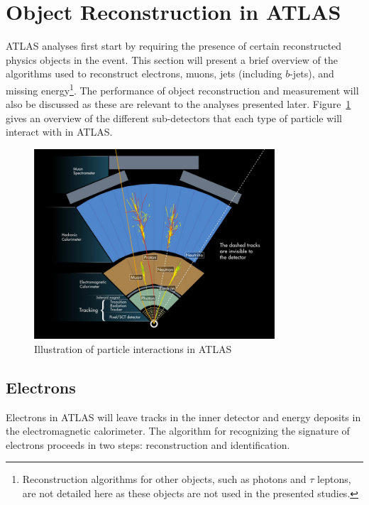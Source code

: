 \section{Object Reconstruction in ATLAS}

ATLAS analyses first start by requiring the presence of certain reconstructed physics objects in the event. This section will present a brief overview of the algorithms used to reconstruct electrons, muons, jets (including $b$-jets), and missing energy\footnote{Reconstruction algorithms for other objects, such as photons and $\tau$ leptons, are not detailed here as these objects are not used in the presented studies.}. The performance of object reconstruction and measurement will also be discussed as these are relevant to the analyses presented later. Figure~\ref{fig:reco_overview} gives an overview of the different sub-detectors that each type of particle will interact with in ATLAS. 

\begin{figure}[h!]
  \centering
  \captionsetup{justification=centering}

  \includegraphics[width=0.8\textwidth]{figures/ATLAS_reco}
   \caption{Illustration of particle interactions in ATLAS~\cite{ATLAS_Particles}}
  \label{fig:reco_overview}
\end{figure}

\subsection{Electrons}

Electrons in ATLAS will leave tracks in the inner detector and energy deposits in the electromagnetic calorimeter. The algorithm for recognizing the signature of electrons proceeds in two steps: reconstruction and identification. 

